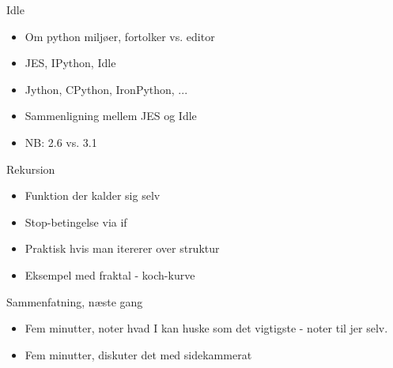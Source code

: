 \documentclass[a4paper,landscape]{slides}
\begin{document}
\begin{slide}
	\begin{center} {\large 
            Idle
	} \end{center}
	\begin{itemize} \addtolength{\itemsep}{-\baselineskip}
                \item Om python miljøer, fortolker vs. editor
                \item JES, IPython, Idle
                \item Jython, CPython, IronPython, ...
		\item Sammenligning mellem JES og Idle
                \item NB: 2.6 vs. 3.1
	\end{itemize}
\end{slide}

\begin{slide}
	\begin{center} {\large 
            Rekursion
	} \end{center}
	\begin{itemize} \addtolength{\itemsep}{-\baselineskip}
                \item Funktion der kalder sig selv
                \item Stop-betingelse via if
                \item Praktisk hvis man itererer over struktur
		\item Eksempel med fraktal - koch-kurve
	\end{itemize}
\end{slide}


\begin{slide}
	\begin{center} {\large 
            Sammenfatning, næste gang
	} \end{center}
	\begin{itemize} \addtolength{\itemsep}{-\baselineskip}
		\item Fem minutter, noter hvad I kan huske som det vigtigste - noter til jer selv.
		\item Fem minutter, diskuter det med sidekammerat
	\end{itemize}
\end{slide}
\end{document}
